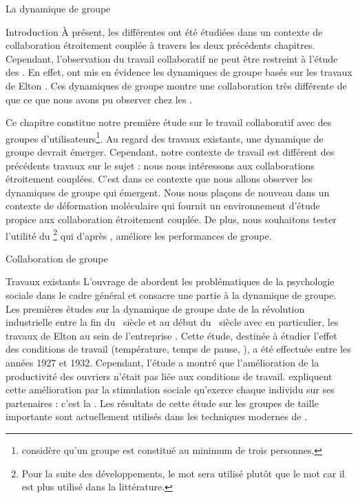 \documentclass[myfrancais,ngerman,english,frenchb]{mythesis}
\begin{document}
	\begin{mychapter}{La dynamique de groupe}
		\begin{mysection}{Introduction}
			À présent, les différentes  ont été étudiées dans un contexte de collaboration étroitement couplée à travers les deux précédents chapitres.
			Cependant, l'observation du travail collaboratif ne peut être restreint à l'étude des .
			En effet,  ont mis en évidence les dynamiques de groupe basés sur les travaux de Elton .
			Ces dynamiques de groupe montre une collaboration très différente de que ce que nous avons pu observer chez les .

			Ce chapitre constitue notre première étude sur le travail collaboratif avec des groupes d'utilisateurs\footnote{ considère qu'un groupe est constitué au minimum de trois personnes.}.
			Au regard des travaux existants, une dynamique de groupe devrait émerger.
			Cependant, notre contexte de travail est différent des précédents travaux sur le sujet : nous nous intéressons aux collaborations étroitement couplées.
			C'est dans ce contexte que nous allons observer les dynamiques de groupe qui émergent.
			Nous nous plaçons de nouveau dans un contexte de déformation moléculaire qui fournit un environnement d'étude propice aux collaboration étroitement couplée.
			De plus, nous souhaitons tester l'utilité du \mybrainstorming\footnote{Pour la suite des développements, le mot \mybrainstorming sera utilisé plutôt que le mot  car il est plus utilisé dans la littérature.} qui d'après , améliore les performances de groupe.
		\end{mysection}
		\begin{mysection}{Collaboration de groupe}
			\begin{mysubsection}{Travaux existants}
				L'ouvrage de  abordent les problématiques de la psychologie sociale dans le cadre général et consacre une partie à la dynamique de groupe.
				Les premières études sur la dynamique de groupe date de la révolution industrielle entre la fin du ~siècle et au début du ~siècle avec en particulier, les travaux de Elton  au sein de l'entreprise \myHawthorne.
				Cette étude, destinée à étudier l'effet des conditions de travail (température, temps de pause, \myetc), a été effectuée entre les années 1927 et 1932.
				Cependant, l'étude a montré que l'amélioration de la productivité des ouvriers n'était pas liée aux conditions de travail.
				 expliquent cette amélioration par la stimulation sociale qu'exerce chaque individu sur ses partenaires : c'est la .
				Les résultats de cette étude sur les groupes de taille importante sont actuellement utilisés dans les techniques modernes de  .


\end{mysubsection}
\end{mysection}
\end{mychapter}
\end{document}
